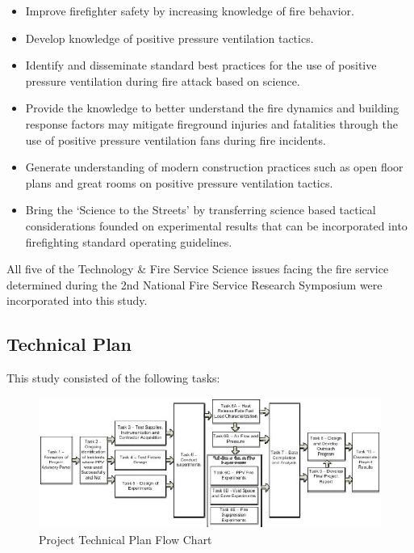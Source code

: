 \documentclass{article}
\begin{document}
\begin{itemize}
	\item Improve firefighter safety by increasing knowledge of fire behavior.
	\item Develop knowledge of positive pressure ventilation tactics.
	\item Identify and disseminate standard best practices for the use of positive pressure ventilation during fire attack based on science.
	\item Provide the knowledge to better understand the fire dynamics and building response factors may mitigate fireground injuries and fatalities through the use of positive pressure ventilation fans during fire incidents.
	\item Generate understanding of modern construction practices such as open floor plans and great rooms on positive pressure ventilation tactics.
	\item Bring the ‘Science to the Streets’ by transferring science based tactical considerations founded on experimental results that can be incorporated into firefighting standard operating guidelines.
\end{itemize}

All five of the Technology \& Fire Service Science issues facing the fire service determined during the 2nd National Fire Service Research Symposium \cite{NFFF} were incorporated into this study.

\subsection{Technical Plan}

This study consisted of the following tasks:

\begin{figure}[H]
	\centering
	\includegraphics[width = 6in]{0_Images/Objectives_and_Technical_Plan/DHS2012_TechnicalPlan_FlowChart.jpg}
	\caption{Project Technical Plan Flow Chart}
	\label{fig:TechPlanChart}
\end{figure}
\end{document}
